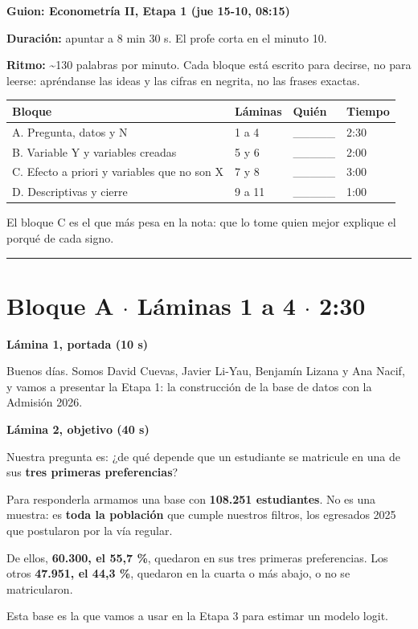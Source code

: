 \documentclass[11pt]{article}
\begin{document}
{\LARGE\bfseries Guion: Econometría II, Etapa 1 (jue 15-10, 08:15)\par}\medskip

\textbf{Duración:} apuntar a 8 min 30 s. El profe corta en el minuto 10.\par
\textbf{Ritmo:} \textasciitilde{}130 palabras por minuto. Cada bloque está escrito para decirse, no para leerse: apréndanse las ideas y las cifras en negrita, no las frases exactas.\par

\begin{tabularx}{\linewidth}{lllX}\toprule
\textbf{Bloque} & \textbf{Láminas} & \textbf{Quién} & \textbf{Tiempo}\\ \midrule
A. Pregunta, datos y N & 1 a 4 & \_\_\_\_\_ & 2:30\\
B. Variable Y y variables creadas & 5 y 6 & \_\_\_\_\_ & 2:00\\
C. Efecto a priori y variables que no son X & 7 y 8 & \_\_\_\_\_ & 3:00\\
D. Descriptivas y cierre & 9 a 11 & \_\_\_\_\_ & 1:00\\
\bottomrule\end{tabularx}\medskip

El bloque C es el que más pesa en la nota: que lo tome quien mejor explique el porqué de cada signo.\par

\medskip\hrule\medskip

\section*{Bloque A $\cdot$ Láminas 1 a 4 $\cdot$ 2:30}

\textbf{Lámina 1, portada (10 s)}\par
\begin{guion}Buenos días. Somos David Cuevas, Javier Li-Yau, Benjamín Lizana y Ana Nacif, y vamos a presentar la Etapa 1: la construcción de la base de datos con la Admisión 2026.\end{guion}

\textbf{Lámina 2, objetivo (40 s)}\par
\begin{guion}Nuestra pregunta es: ¿de qué depende que un estudiante se matricule en una de sus \textbf{tres primeras preferencias}?\par Para responderla armamos una base con \textbf{108.251 estudiantes}. No es una muestra: es \textbf{toda la población} que cumple nuestros filtros, los egresados 2025 que postularon por la vía regular.\par De ellos, \textbf{60.300, el 55,7 \%}, quedaron en sus tres primeras preferencias. Los otros \textbf{47.951, el 44,3 \%}, quedaron en la cuarta o más abajo, o no se matricularon.\par Esta base es la que vamos a usar en la Etapa 3 para estimar un modelo logit.\end{guion}
\end{document}

